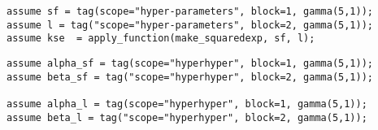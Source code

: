 \begin{lstlisting}[mathescape,escapechar=\#]
assume sf = tag(scope="hyper-parameters", block=1, gamma(5,1));
assume l = tag("scope="hyper-parameters", block=2, gamma(5,1));
assume kse  = apply_function(make_squaredexp, sf, l);

\end{lstlisting}

\begin{lstlisting}[mathescape,escapechar=\#]
assume alpha_sf = tag(scope="hyperhyper", block=1, gamma(5,1));
assume beta_sf = tag("scope="hyperhyper", block=2, gamma(5,1));

assume alpha_l = tag(scope="hyperhyper", block=1, gamma(5,1));
assume beta_l = tag("scope="hyperhyper", block=2, gamma(5,1));
\end{lstlisting}
